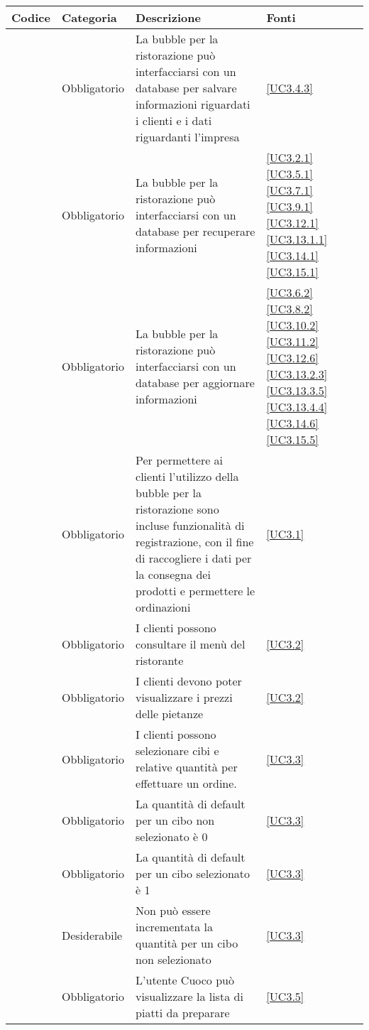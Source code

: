 \begin{longtable}{|P{1.5cm}|P{2.5cm}|P{6.5cm}|P{2.5cm}|}
	\hline \textbf{Codice} & \textbf{Categoria} & \textbf{Descrizione} & \textbf{Fonti} \\
	
	\hline \RequisitoObF\label{L21} & Obbligatorio & La bubble per la ristorazione può interfacciarsi con un database per salvare informazioni riguardati i clienti e i dati riguardanti l'impresa &  \ref{UC3.4.3} \\
	\hline \RequisitoObF\label{L61} & Obbligatorio & La bubble per la ristorazione può interfacciarsi con un database per recuperare informazioni & \ref{UC3.2.1} \ref{UC3.5.1} \ref{UC3.7.1}  \ref{UC3.9.1} \ref{UC3.12.1} \ref{UC3.13.1.1} \ref{UC3.14.1} \ref{UC3.15.1} \\
	\hline \RequisitoObF\label{L62} & Obbligatorio & La bubble per la ristorazione può interfacciarsi con un database per aggiornare informazioni & \ref{UC3.6.2} \ref{UC3.8.2} \ref{UC3.10.2} \ref{UC3.11.2} \ref{UC3.12.6}  \ref{UC3.13.2.3} \ref{UC3.13.3.5} \ref{UC3.13.4.4} \ref{UC3.14.6} \ref{UC3.15.5} \\	
	\hline \RequisitoObF\label{L22} & Obbligatorio & Per permettere ai clienti l'utilizzo della bubble per la ristorazione sono incluse funzionalità di registrazione, con il fine di raccogliere i dati per la consegna dei prodotti e permettere le ordinazioni & \ref{UC3.1} \\
	\hline \RequisitoObF\label{L23} & Obbligatorio & I clienti possono consultare il menù del ristorante & \ref{UC3.2} \\
	\hline \RequisitoObF \label{L68} & Obbligatorio & I clienti devono poter visualizzare i prezzi delle pietanze & \ref{UC3.2}\\
	\hline \RequisitoObF\label{L24} & Obbligatorio & I clienti possono selezionare cibi e relative quantità per effettuare un ordine. & \ref{UC3.3} \\
	\hline \RequisitoObF\label{L69} & Obbligatorio & La quantità di default per un cibo non selezionato è 0 & \ref{UC3.3} \\
	\hline \RequisitoObF\label{L77} & Obbligatorio & La quantità di default per un cibo selezionato è 1 & \ref{UC3.3} \\
	\hline \RequisitoDF\label{L70} & Desiderabile & Non può essere incrementata la quantità per un cibo non selezionato & \ref{UC3.3} \\
	\hline \RequisitoObF\label{L25} & Obbligatorio & L'utente Cuoco può visualizzare la lista di piatti da preparare & \ref{UC3.5} \\

\end{longtable}
